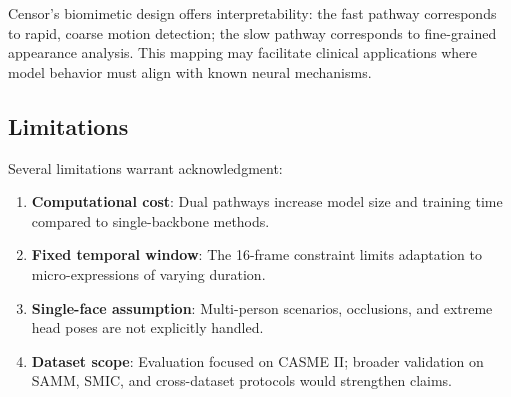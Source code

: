 Censor's biomimetic design offers interpretability: the fast pathway corresponds to rapid, coarse motion detection; the slow pathway corresponds to fine-grained appearance analysis. This mapping may facilitate clinical applications where model behavior must align with known neural mechanisms.

\subsection{Limitations}

Several limitations warrant acknowledgment:
\begin{enumerate}
\item \textbf{Computational cost}: Dual pathways increase model size and training time compared to single-backbone methods.
\item \textbf{Fixed temporal window}: The 16-frame constraint limits adaptation to micro-expressions of varying duration.
\item \textbf{Single-face assumption}: Multi-person scenarios, occlusions, and extreme head poses are not explicitly handled.
\item \textbf{Dataset scope}: Evaluation focused on CASME II; broader validation on SAMM, SMIC, and cross-dataset protocols would strengthen claims.
\end{enumerate}